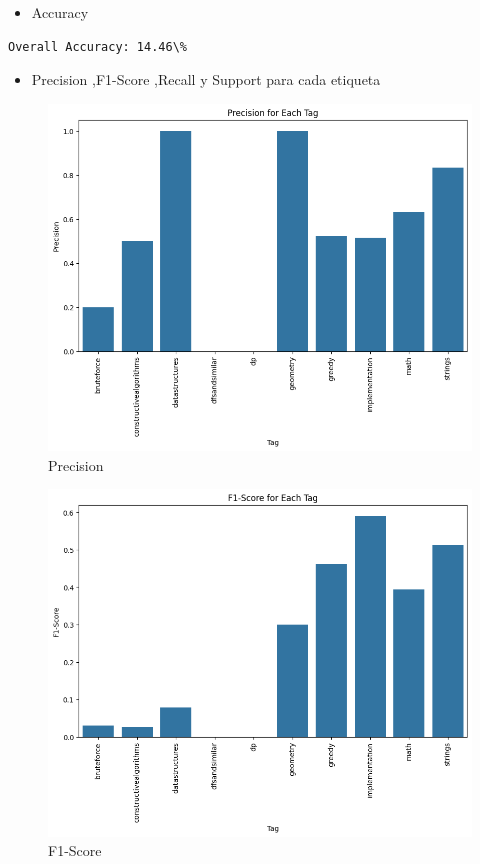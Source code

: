 \documentclass{article}
\begin{document}
\begin{itemize}
    \item Accuracy
\end{itemize}
\begin{verbatim}
Overall Accuracy: 14.46\%
\end{verbatim}

\newpage
\begin{itemize}
    \item Precision ,F1-Score ,Recall y Support para cada etiqueta
\end{itemize}
\begin{figure}[H]
    \centering
    \includegraphics[scale=0.49]{imgs/precisonnb.png}
    \caption{Precision}
    \label{fig:p}
\end{figure}
\begin{figure}[H]
    \centering
    \includegraphics[scale=0.49]{imgs/f1nb.png}
    \caption{F1-Score}
    \label{fig:f1}
\end{figure}
\end{document}
